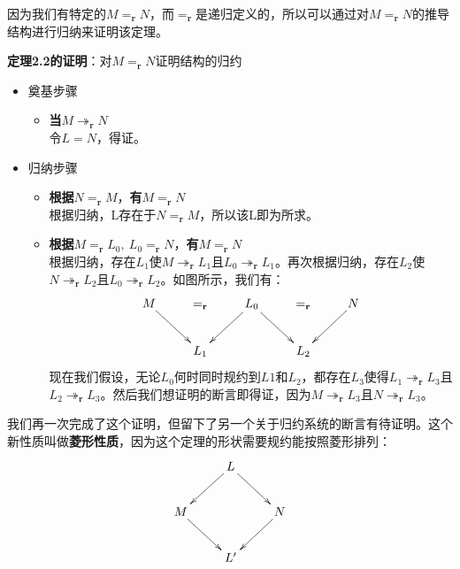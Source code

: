 \documentclass{book}
\def\r{\mathbf{r}}
\begin{document}
因为我们有特定的$M=_\r N$，而$=_\r$是递归定义的，所以可以通过对$M=_\r N$的推导结构进行归纳来证明该定理。
\begin{adjustwidth}{20pt}{20pt}
\textbf{定理2.2的证明}：对$M=_\r N$证明结构的归约

\begin{itemize}
  \item 奠基步骤
  \begin{itemize}
    \item \textbf{当}$M\twoheadrightarrow_\r N$\\
    令$L=N$，得证。
  \end{itemize}

  \item 归纳步骤
  \begin{itemize}
    \item \textbf{根据}$N=_\r M$，\textbf{有}$M=_\r N$\\
    根据归纳，L存在于$N=_\r M$，所以该L即为所求。
    \item \textbf{根据}$M=_\r L_0,\ L_0=_\r N$，\textbf{有}$M=_\r N$\\
    根据归纳，存在$L_1$使$M\twoheadrightarrow_\r L_1$且$L_0\twoheadrightarrow_\r L_1$。再次根据归纳，存在$L_2$使$N\twoheadrightarrow_\r L_2$且$L_0\twoheadrightarrow_\r L_2$。如图所示，我们有：
    $$
     \xymatrix{
      {M}\ar[rd] & {=_\r } & {L_0} \ar[ld] \ar[rd] &  {=_\r } & {N} \ar[ld]\\
       & {L_1} & & {L_2}
     }
$$
    现在我们假设，无论$L_0$何时同时规约到$L1$和$L_2$，都存在$L_3$使得$L_1\twoheadrightarrow_\r L_3$且$L_2\twoheadrightarrow_\r L_3$。然后我们想证明的断言即得证，因为$M\twoheadrightarrow_\r L_3$且$N\twoheadrightarrow_\r L_3$。
  \end{itemize}
\end{itemize}
\end{adjustwidth}
我们再一次完成了这个证明，但留下了另一个关于归约系统的断言有待证明。这个新性质叫做\textbf{菱形性质}，因为这个定理的形状需要规约能按照菱形排列：
$$
 \xymatrix{
   & {L} \ar[ld] \ar[rd]&\\
{M}\ar[rd]   & & {N}\ar[ld]\\
& {L'} &
 }
$$
\end{document}
